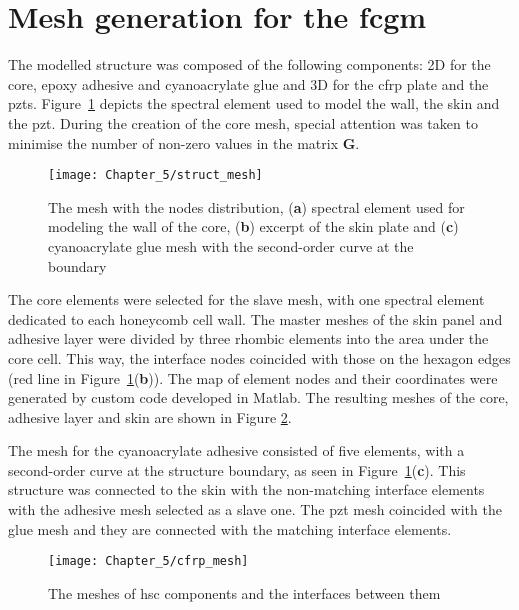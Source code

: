 \section{Mesh generation for the \acl{fcgm}}
\label{sec:honeycomb}

The modelled structure was composed of the following components: 2D for the core, epoxy adhesive and cyanoacrylate glue and 3D for the \ac{cfrp} plate and the \acp{pzt}.
Figure~\ref{fig:struct_mesh} depicts the spectral element used to model the wall, the skin and the \ac{pzt}.
During the creation of the core mesh, special attention was taken to minimise the number of non-zero values in the matrix \(\textbf{G}\).
\begin{figure}[H]
	\begin{center}
		\texttt{[image: Chapter\_5/struct\_mesh]}
	\end{center}
	\caption{The mesh with the nodes distribution, (\textbf{a}) spectral element used for modeling the wall of the core, (\textbf{b}) excerpt of the skin plate and (\textbf{c}) cyanoacrylate glue mesh with the second-order curve at the boundary}
	\label{fig:struct_mesh}
\end{figure}

The core elements were selected for the slave mesh, with one spectral element dedicated to each honeycomb cell wall.
The master meshes of the skin panel and adhesive layer were divided by three rhombic elements into the area under the core cell.
This way, the interface nodes coincided with those on the hexagon edges (red line in Figure~\ref{fig:struct_mesh}(\textbf{b})).
The map of element nodes and their coordinates were generated by custom code developed in Matlab.
The resulting meshes of the core, adhesive layer and skin are shown in Figure \ref{fig:cas_mesh}.

The mesh for the cyanoacrylate adhesive consisted of five elements, with a second-order curve at the structure boundary, as seen in Figure~\ref{fig:struct_mesh}(\textbf{c}).
This structure was connected to the skin with the non-matching interface elements with the adhesive mesh selected as a slave one.
The \ac{pzt} mesh coincided with the glue mesh and they are connected with the matching interface elements.

\begin{figure}[H]
	\begin{center}
		\texttt{[image: Chapter\_5/cfrp\_mesh]}
	\end{center}
	\caption{The meshes of \acl{hsc} components and the interfaces between them}
	\label{fig:cas_mesh}
\end{figure}
